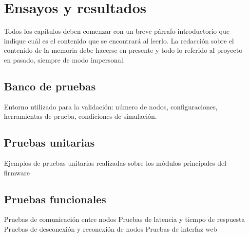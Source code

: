 
\chapter{Ensayos y resultados} %

\label{Chapter4} %
Todos los capítulos deben comenzar con un breve párrafo introductorio que indique cuál es el contenido que se encontrará al leerlo.  La redacción sobre el contenido de la memoria debe hacerse en presente y todo lo referido al proyecto en pasado, siempre de modo impersonal.


\section{Banco de pruebas}
Entorno utilizado para la validación: número de nodos, configuraciones, herramientas de prueba, condiciones de simulación.

\section{Pruebas unitarias}
Ejemplos de pruebas unitarias realizadas sobre los módulos principales del firmware

\section{Pruebas funcionales}
\label{sec:pruebasHW}

Pruebas de comunicación entre nodos
Pruebas de latencia y tiempo de respuesta
Pruebas de desconexión y reconexión de nodos
Pruebas de interfaz web
